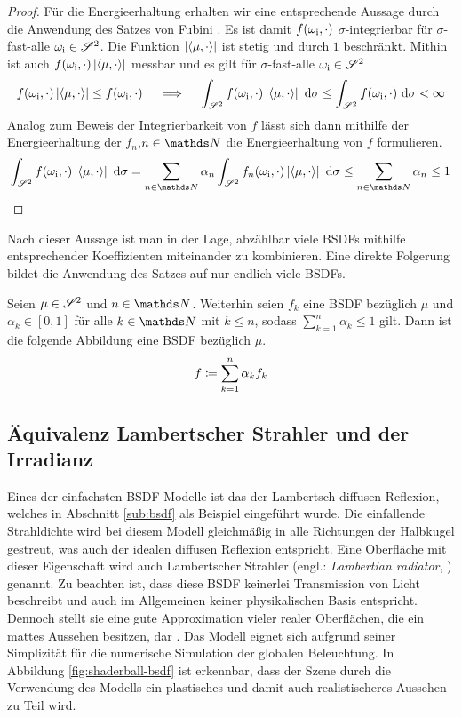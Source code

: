\begin{proof}
			Für die Energieerhaltung erhalten wir eine entsprechende Aussage durch die Anwendung des Satzes von Fubini \cite[S.~175~f]{measure-theory}.
			Es ist damit $f(\omega_{\mathrm{i}},\cdot)$ $\sigma$-integrierbar für $\sigma$-fast-alle $\omega_{\mathrm{i}}\in\mathscr{S}^{2}$.
			Die Funktion $\left\vert \left\langle \mu,\cdot \right\rangle \right\vert$ ist stetig und durch $1$ beschränkt.
			Mithin ist auch $f(\omega_{\mathrm{i}},\cdot)\left\vert \left\langle \mu,\cdot \right\rangle \right\vert$ messbar und es gilt für $\sigma$-fast-alle $\omega_{\mathrm{i}}\in\mathscr{S}^{2}$
			\[
				f(\omega_{\mathrm{i}},\cdot)\left\vert \left\langle \mu,\cdot \right\rangle \right\vert \leq f(\omega_{\mathrm{i}},\cdot) \quad \implies \quad \int_{\mathscr{S}^{2}}^{} f(\omega_{\mathrm{i}},\cdot)\left\vert \left\langle \mu,\cdot \right\rangle \right\vert\ \mathrm{d} \sigma \leq \int_{\mathscr{S}^{2}}^{} f(\omega_{\mathrm{i}},\cdot)\ \mathrm{d} \sigma < \infty
			\]
			Analog zum Beweis der Integrierbarkeit von $f$ lässt sich dann mithilfe der Energieerhaltung der $f_n$,$n\in\SN$ die Energieerhaltung von $f$ formulieren.
			\[
				\integral{\ssp}{}{f(\omega_\m{i},\cdot)\abs{\dotp{\mu}{\cdot}}}{\sigma} = \sum_{n\in\SN}\alpha_n \integral{\ssp}{}{f_n(\omega_\m{i},\cdot)\abs{\dotp{\mu}{\cdot}}}{\sigma} \leq \sum_{n\in\SN}\alpha_n \leq 1
			\]
		\end{proof}

		Nach dieser Aussage ist man in der Lage, abzählbar viele BSDFs mithilfe entsprechender Koeffizienten miteinander zu kombinieren.
		Eine direkte Folgerung bildet die Anwendung des Satzes auf nur endlich viele BSDFs.
		\begin{corollary*}
			Seien $\mu\in\mathscr{S}^{2}$ und $n\in\SN$.
			Weiterhin seien $f_k$ eine BSDF bezüglich $\mu$ und $\alpha_k\in[0,1]$ für alle $k\in\SN$ mit $k\leq n$, sodass $\sum_{k=1}^n \alpha_k \leq 1$ gilt.
			Dann ist die folgende Abbildung eine BSDF bezüglich $\mu$.
			\[
				f\coloneqq \sum_{k=1}^n\alpha_k f_k
			\]
		\end{corollary*}


	\subsection{Äquivalenz Lambertscher Strahler und der Irradianz} %
	\label{sub:aquivalenz_lambertscher_strahler_und_der_irradianz}

		Eines der einfachsten BSDF-Modelle ist das der Lambertsch diffusen Reflexion, welches in Abschnitt \ref{sub:bsdf} als Beispiel eingeführt wurde.
		Die einfallende Strahldichte wird bei diesem Modell gleichmäßig in alle Richtungen der Halbkugel gestreut, was auch der idealen diffusen Reflexion entspricht.
		Eine Oberfläche mit dieser Eigenschaft wird auch Lambertscher Strahler (engl.: \textit{Lambertian radiator}, \cite[S.~17]{intro-radiometry}) genannt.
		Zu beachten ist, dass diese BSDF keinerlei Transmission von Licht beschreibt und auch im Allgemeinen keiner physikalischen Basis entspricht.
		Dennoch stellt sie eine gute Approximation vieler realer Oberflächen, die ein mattes Aussehen besitzen, dar \cite[S.~532]{pbrt3}.
		Das Modell eignet sich aufgrund seiner Simplizität für die numerische Simulation der globalen Beleuchtung.
		In Abbildung \ref{fig:shaderball-bsdf} ist erkennbar, dass der Szene durch die Verwendung des Modells ein plastisches und damit auch realistischeres Aussehen zu Teil wird.

